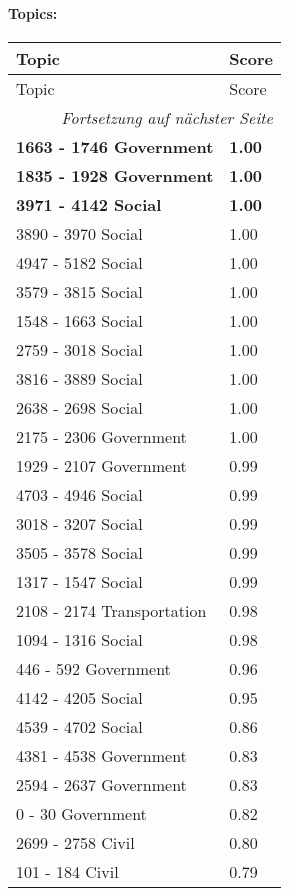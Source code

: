 \documentclass{article}
\begin{document}
\paragraph{Topics:}
\begin{longtable}{ll}
\hline
Topic & Score \\ \hline
\endfirsthead
\hline
Topic & Score \\ \hline
\endhead
\hline
\multicolumn{2}{r}{\textit{Fortsetzung auf nächster Seite}} \\ \hline
\endfoot
\hline
\endlastfoot
\textbf{1663 - 1746 Government} & \textbf{1.00} \\ \hline
\textbf{1835 - 1928 Government} & \textbf{1.00} \\ \hline
\textbf{3971 - 4142 Social} & \textbf{1.00} \\ \hline
3890 - 3970 Social & 1.00 \\ \hline
4947 - 5182 Social & 1.00 \\ \hline
3579 - 3815 Social & 1.00 \\ \hline
1548 - 1663 Social & 1.00 \\ \hline
2759 - 3018 Social & 1.00 \\ \hline
3816 - 3889 Social & 1.00 \\ \hline
2638 - 2698 Social & 1.00 \\ \hline
2175 - 2306 Government & 1.00 \\ \hline
1929 - 2107 Government & 0.99 \\ \hline
4703 - 4946 Social & 0.99 \\ \hline
3018 - 3207 Social & 0.99 \\ \hline
3505 - 3578 Social & 0.99 \\ \hline
1317 - 1547 Social & 0.99 \\ \hline
2108 - 2174 Transportation & 0.98 \\ \hline
1094 - 1316 Social & 0.98 \\ \hline
446 - 592 Government & 0.96 \\ \hline
4142 - 4205 Social & 0.95 \\ \hline
4539 - 4702 Social & 0.86 \\ \hline
4381 - 4538 Government & 0.83 \\ \hline
2594 - 2637 Government & 0.83 \\ \hline
0 - 30 Government & 0.82 \\ \hline
2699 - 2758 Civil & 0.80 \\ \hline
101 - 184 Civil & 0.79 \\ \hline

\end{longtable}
\end{document}
